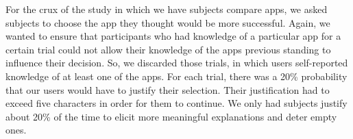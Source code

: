 For the crux of the study in which we have subjects compare apps, we asked subjects to choose the app they thought would be more successful.  Again, we wanted to ensure that participants who had knowledge of a particular app for a certain trial could not allow their knowledge of the apps previous standing to influence their decision. So, we discarded those trials, in which users self-reported knowledge of at least one of the apps. For each trial, there was a 20\% probability that our users would have to justify their selection. Their justification had to exceed five characters in order for them to continue. We only had subjects justify about 20\% of the time to elicit more meaningful explanations and deter empty ones.
